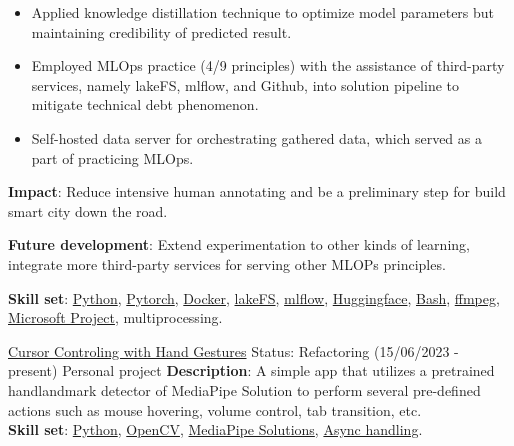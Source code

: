 \documentclass{src/preamble/doc_class}
\begin{document}
\begin{MainPart}
{\begin{itemize}[label=$\bullet$,topsep=-.5ex,itemsep=-0.5ex]
            	\item Applied knowledge distillation technique to optimize model parameters but maintaining credibility of predicted result.

            	\item Employed MLOps practice (4/9 principles) with the assistance of third-party services, namely lakeFS, mlflow, and Github, into solution pipeline to mitigate technical debt phenomenon.

            	\item Self-hosted data server for orchestrating gathered data, which served as a part of practicing MLOps.
            \end{itemize}
            \vspace{.15cm}

            \textbf{Impact}: Reduce intensive human annotating and be a preliminary step for build smart city down the road.
            \vspace{.15cm}

            \textbf{Future development}: Extend experimentation to other kinds of learning, integrate more third-party services for serving other MLOPs principles.
            \vspace{.1cm}

            \textbf{Skill set}: \href{https://www.python.org/}{Python}, \href{https://pytorch.org/}{Pytorch}, \href{https://www.docker.com/}{Docker}, \href{https://lakefs.io/}{lakeFS}, \href{https://mlflow.org/}{mlflow}, \href{https://huggingface.co/}{Huggingface}, \href{https://www.gnu.org/software/bash/}{Bash}, \href{https://ffmpeg.org/}{ffmpeg}, \href{https://www.microsoft.com/en/microsoft-365/planner/microsoft-planner?market=af}{Microsoft Project}, multiprocessing.
        }

		\Experience
		{\ColorHighlight}
		{\href{https://github.com/diligent-man/Cursor-controlling-with-hand-gestures/tree/main}{Cursor Controling with Hand Gestures}}
		{Status: Refactoring (15/06/2023 - present)}
		{Personal project}
		{
			\textbf{Description}: A simple app that utilizes a pretrained handlandmark detector of MediaPipe Solution to perform several pre-defined actions such as mouse hovering, volume control, tab transition, etc.\\

			\vspace{.15cm}
			\textbf{Skill set}: \href{https://www.python.org/}{Python}, \href{https://opencv.org/}{OpenCV}, \href{https://ai.google.dev/edge/mediapipe/solutions/guide}{MediaPipe Solutions}, \href{https://docs.python.org/3/library/asyncio.html}{Async handling}.
		}

		\end{MainPart}
		\newpage
\end{document}
